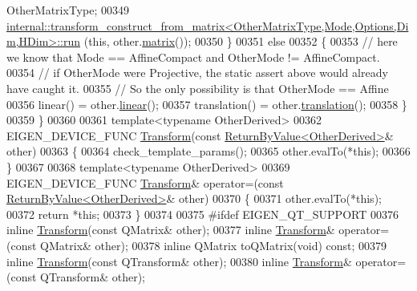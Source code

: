 \begin{DoxyCode}
       OtherMatrixType;
00349       
      \hyperlink{struct_eigen_1_1internal_1_1transform__construct__from__matrix}{internal::transform\_construct\_from\_matrix<OtherMatrixType,Mode,Options,Dim,HDim>::run}
      (\textcolor{keyword}{this}, other.\hyperlink{group___geometry___module_aec8168000a88a807130d41020af98d47}{matrix}());
00350     \}
00351     \textcolor{keywordflow}{else}
00352     \{
00353       \textcolor{comment}{// here we know that Mode == AffineCompact and OtherMode != AffineCompact.}
00354       \textcolor{comment}{// if OtherMode were Projective, the static assert above would already have caught it.}
00355       \textcolor{comment}{// So the only possibility is that OtherMode == Affine}
00356       linear() = other.\hyperlink{group___geometry___module_a535bd63d047c2a36585c3f9b62219a1e}{linear}();
00357       translation() = other.\hyperlink{group___geometry___module_afa93ba97d26912bb3d8777cbed102045}{translation}();
00358     \}
00359   \}
00360 
00361   \textcolor{keyword}{template}<\textcolor{keyword}{typename} OtherDerived>
00362   EIGEN\_DEVICE\_FUNC \hyperlink{group___geometry___module_class_eigen_1_1_transform}{Transform}(\textcolor{keyword}{const} \hyperlink{group___core___module_class_eigen_1_1_return_by_value}{ReturnByValue<OtherDerived>}& other)
00363   \{
00364     check\_template\_params();
00365     other.evalTo(*\textcolor{keyword}{this});
00366   \}
00367 
00368   \textcolor{keyword}{template}<\textcolor{keyword}{typename} OtherDerived>
00369   EIGEN\_DEVICE\_FUNC \hyperlink{group___geometry___module_class_eigen_1_1_transform}{Transform}& operator=(\textcolor{keyword}{const} 
      \hyperlink{group___core___module_class_eigen_1_1_return_by_value}{ReturnByValue<OtherDerived>}& other)
00370   \{
00371     other.evalTo(*\textcolor{keyword}{this});
00372     \textcolor{keywordflow}{return} *\textcolor{keyword}{this};
00373   \}
00374 
00375 \textcolor{preprocessor}{  #ifdef EIGEN\_QT\_SUPPORT}
00376   \textcolor{keyword}{inline} \hyperlink{group___geometry___module_class_eigen_1_1_transform}{Transform}(\textcolor{keyword}{const} QMatrix& other);
00377   \textcolor{keyword}{inline} \hyperlink{group___geometry___module_class_eigen_1_1_transform}{Transform}& operator=(\textcolor{keyword}{const} QMatrix& other);
00378   \textcolor{keyword}{inline} QMatrix toQMatrix(\textcolor{keywordtype}{void}) \textcolor{keyword}{const};
00379   \textcolor{keyword}{inline} \hyperlink{group___geometry___module_class_eigen_1_1_transform}{Transform}(\textcolor{keyword}{const} QTransform& other);
00380   \textcolor{keyword}{inline} \hyperlink{group___geometry___module_class_eigen_1_1_transform}{Transform}& operator=(\textcolor{keyword}{const} QTransform& other);

\end{DoxyCode}
